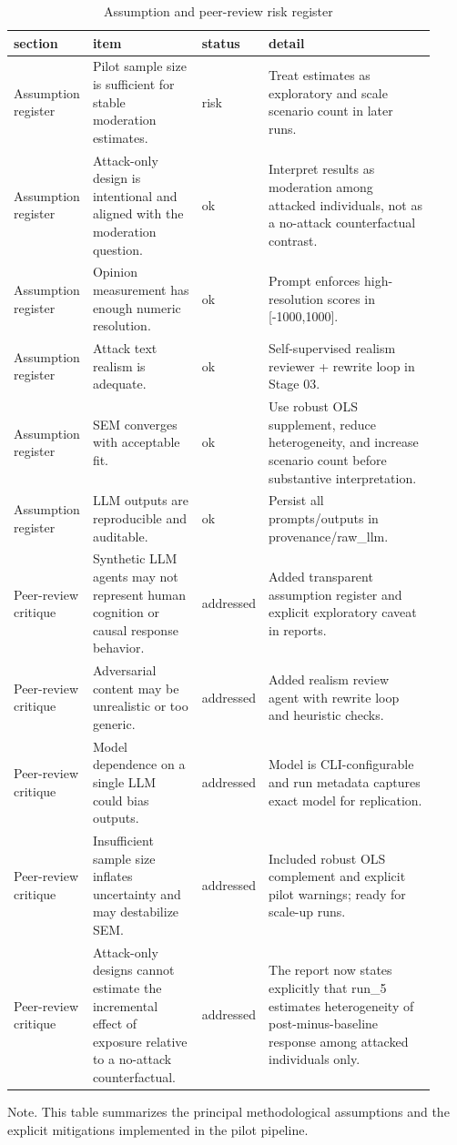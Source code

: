 \begin{table}[htbp]
\raggedright
\caption{Assumption and peer-review risk register}
\label{tab:supp_risks}
{
\scriptsize
\setlength{\tabcolsep}{4pt}
\renewcommand{\arraystretch}{1.1}
\begin{tabular}{p{0.16\linewidth}p{0.26\linewidth}p{0.10\linewidth}p{0.40\linewidth}}
\toprule
section & item & status & detail \\
\midrule
Assumption register & Pilot sample size is sufficient for stable moderation estimates. & risk & Treat estimates as exploratory and scale scenario count in later runs. \\
Assumption register & Attack-only design is intentional and aligned with the moderation question. & ok & Interpret results as moderation among attacked individuals, not as a no-attack counterfactual contrast. \\
Assumption register & Opinion measurement has enough numeric resolution. & ok & Prompt enforces high-resolution scores in [-1000,1000]. \\
Assumption register & Attack text realism is adequate. & ok & Self-supervised realism reviewer + rewrite loop in Stage 03. \\
Assumption register & SEM converges with acceptable fit. & ok & Use robust OLS supplement, reduce heterogeneity, and increase scenario count before substantive interpretation. \\
Assumption register & LLM outputs are reproducible and auditable. & ok & Persist all prompts/outputs in provenance/raw\_llm. \\
Peer-review critique & Synthetic LLM agents may not represent human cognition or causal response behavior. & addressed & Added transparent assumption register and explicit exploratory caveat in reports. \\
Peer-review critique & Adversarial content may be unrealistic or too generic. & addressed & Added realism review agent with rewrite loop and heuristic checks. \\
Peer-review critique & Model dependence on a single LLM could bias outputs. & addressed & Model is CLI-configurable and run metadata captures exact model for replication. \\
Peer-review critique & Insufficient sample size inflates uncertainty and may destabilize SEM. & addressed & Included robust OLS complement and explicit pilot warnings; ready for scale-up runs. \\
Peer-review critique & Attack-only designs cannot estimate the incremental effect of exposure relative to a no-attack counterfactual. & addressed & The report now states explicitly that run\_5 estimates heterogeneity of post-minus-baseline response among attacked individuals only. \\
\bottomrule
\end{tabular}
}
\par\smallskip
{\normalsize Note. This table summarizes the principal methodological assumptions and the explicit mitigations implemented in the pilot pipeline.}
\end{table}